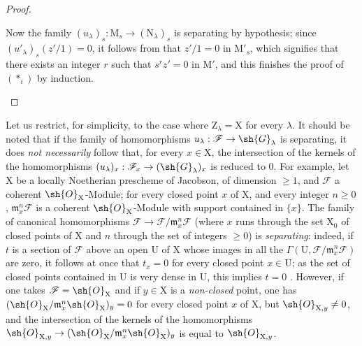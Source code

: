 \begin{proof}
\begin{enumerate}[label=(\roman*)]
  Now the family $(u_\lambda)_s:\mathrm{M}_s\to(\mathrm{N}_\lambda)_s$ is separating by hypothesis; since $(u'_\lambda)_s(z'/1)=0$, it follows from  that $z'/1=0$ in $\mathrm{M}'_s$, which signifies that there exists an integer $r$ such that $s^r z'=0$ in $\mathrm{M}'$, and this finishes the proof of $(*_i)$ by induction.
\end{enumerate}
\end{proof}

\begin{remark}[11.9.11]
\label{IV.11.9.11}
Let us restrict, for simplicity, to the case where $\mathrm{Z}_\lambda=\mathrm{X}$ for every $\lambda$.
It should be noted that if the family of homomorphisms $u_\lambda:\mathscr{F}\to\sh{G}_\lambda$ is separating, it does \emph{not necessarily} follow that, for every $x\in\mathrm{X}$, the intersection of the kernels of the homomorphisms $(u_\lambda)_x:\mathscr{F}_x\to(\sh{G}_\lambda)_x$ is reduced to $0$.
For example, let $\mathrm{X}$ be a locally Noetherian prescheme of Jacobson, of dimension $\geq 1$, and $\mathscr{F}$ a coherent $\sh{O}_\mathrm{X}$-Module; for every closed point $x$ of $\mathrm{X}$, and every integer $n\geq 0$, $\mathfrak{m}_x^n\mathscr{F}$ is a coherent $\sh{O}_\mathrm{X}$-Module with support contained in $\{x\}$.
The family of canonical homomorphisms $\mathscr{F}\to\mathscr{F}/\mathfrak{m}_x^n\mathscr{F}$ (where $x$ runs through the set $\mathrm{X}_0$ of closed points of $\mathrm{X}$ and $n$ through the set of integers $\geq 0$) is \emph{separating}: indeed, if $t$ is a section of $\mathscr{F}$ above an open $\mathrm{U}$ of $\mathrm{X}$ whose images in all the $\Gamma(\mathrm{U},\mathscr{F}/\mathfrak{m}_x^n\mathscr{F})$ are zero, it follows at once that $t_x=0$ for every closed point $x\in\mathrm{U}$; as the set of closed points contained in $\mathrm{U}$ is very dense in $\mathrm{U}$, this implies $t=0$ .
However, if one takes $\mathscr{F}=\sh{O}_\mathrm{X}$ and if $y\in\mathrm{X}$ is a \emph{non-closed} point, one has $(\sh{O}_\mathrm{X}/\mathfrak{m}_x^n\sh{O}_\mathrm{X})_y=0$ for every closed point $x$ of $\mathrm{X}$, but $\sh{O}_{\mathrm{X},y}\neq 0$, and the intersection of the kernels of the homomorphisms $\sh{O}_{\mathrm{X},y}\to(\sh{O}_\mathrm{X}/\mathfrak{m}_x^n\sh{O}_\mathrm{X})_y$ is equal to $\sh{O}_{\mathrm{X},y}$.
\end{remark}

